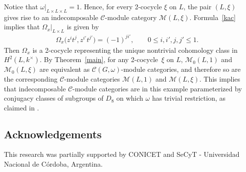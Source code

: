 \documentclass[pdftex]{sigma}
\numberwithin{equation}{section}
\newcommand{\cch}{\Omega}
\newcommand{\C}{{\mathcal C}}
\newcommand{\M}{{\mathcal M}}
\newcommand{\1}{\textbf{1}}
\begin{document}
\begin{Example}
Notice that $\omega\vert_{L \times L\times L} = 1$. Hence, for every 2-cocycle $\xi$ on $L$, the pair $(L, \xi)$ gives rise to an indecomposable $\C$-module category $\M(L, \xi)$.
Formula~\eqref{kac} implies that $\cch_x\vert_{L \times L}$ is given by
\begin{gather*}\cch_x\big(z^{i}t^{j}, z^{i'}t^{j'}\big) = (-1)^{ji'}, \qquad 0\leq i, i', j, j' \leq 1.\end{gather*}
Then $\cch_x$ is a 2-cocycle representing the unique nontrivial cohomology class in $H^2(L, k^\times)$. By Theorem~\ref{main}, for any 2-cocycle~$\xi$ on $L$, $\M_0(L, 1)$ and $\M_0(L, \xi)$ are equivalent as $\C(G, \omega)$-module categories, and therefore so are the corresponding $\C$-module categories $\M(L, 1)$ and $\M(L, \xi)$. This implies that indecomposable $\C$-module categories are in this example parameterized by conjugacy classes of subgroups of $D_8$ on which $\omega$ has trivial restriction, as claimed in \cite[Section~6.4]{MN}.
\end{Example}

\subsection*{Acknowledgements}

This research was partially supported by CONICET and SeCyT - Universidad Nacional de C\'ordoba, Argentina.
\end{document}
